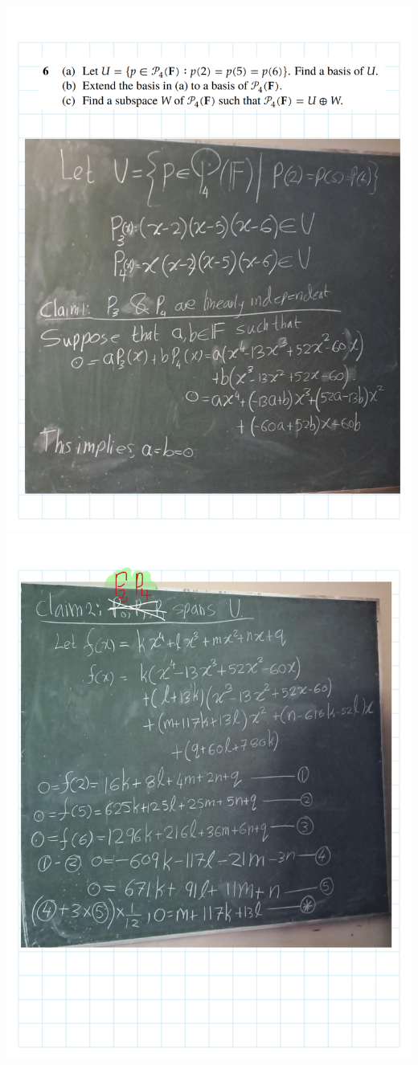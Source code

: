 \documentclass[
]{book}
\theoremstyle{definition}
\theoremstyle{definition}
\theoremstyle{definition}
\theoremstyle{definition}
\theoremstyle{remark}
\begin{document}
\includegraphics{fig/Ex 2B and 2C/Ex 2c (24).png}
\includegraphics{fig/Ex 2B and 2C/Ex 2c (25).png}
\end{document}
